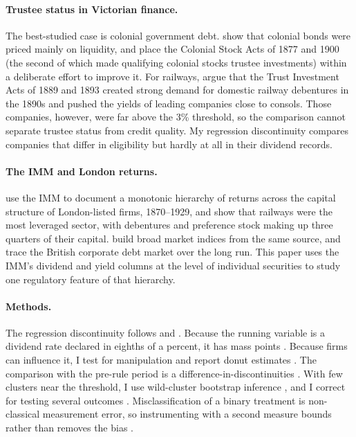 \documentclass[11pt]{article}
\begin{document}
\paragraph{Trustee status in Victorian finance.} The best-studied case is colonial government debt. \citet{ChavazFlandreau2017} show that colonial bonds were priced mainly on liquidity, and place the Colonial Stock Acts of 1877 and 1900 (the second of which made qualifying colonial stocks trustee investments) within a deliberate effort to improve it. For railways, \citet{ChambersCrafts} argue that the Trust Investment Acts of 1889 and 1893 created strong demand for domestic railway debentures in the 1890s and pushed the yields of leading companies close to consols. Those companies, however, were far above the 3\% threshold, so the comparison cannot separate trustee status from credit quality. My regression discontinuity compares companies that differ in eligibility but hardly at all in their dividend records.

\paragraph{The IMM and London returns.} \citet{GoetzmannRouwenhorst2026} use the IMM to document a monotonic hierarchy of returns across the capital structure of London-listed firms, 1870--1929, and show that railways were the most leveraged sector, with debentures and preference stock making up three quarters of their capital. \citet{CampbellGrossmanTurner2021} build broad market indices from the same source, and \citet{CoyleTurner2013} trace the British corporate debt market over the long run. This paper uses the IMM's dividend and yield columns at the level of individual securities to study one regulatory feature of that hierarchy.

\paragraph{Methods.} The regression discontinuity follows \citet{LeeLemieux2010} and \citet{CalonicoCattaneoTitiunik2014}. Because the running variable is a dividend rate declared in eighths of a percent, it has mass points \citep{KolesarRothe2018}. Because firms can influence it, I test for manipulation \citep{McCrary2008, CattaneoJanssonMa2020} and report donut estimates \citep{BarrecaLindoWaddell2016}. The comparison with the pre-rule period is a difference-in-discontinuities \citep{GrembiNanniciniTroiano2016}. With few clusters near the threshold, I use wild-cluster bootstrap inference \citep{CameronGelbachMiller2008, Webb2023}, and I correct for testing several outcomes \citep{Holm1979, RomanoWolf2005}. Misclassification of a binary treatment is non-classical measurement error, so instrumenting with a second measure bounds rather than removes the bias \citep{BlackBergerScott2000}.
\end{document}
